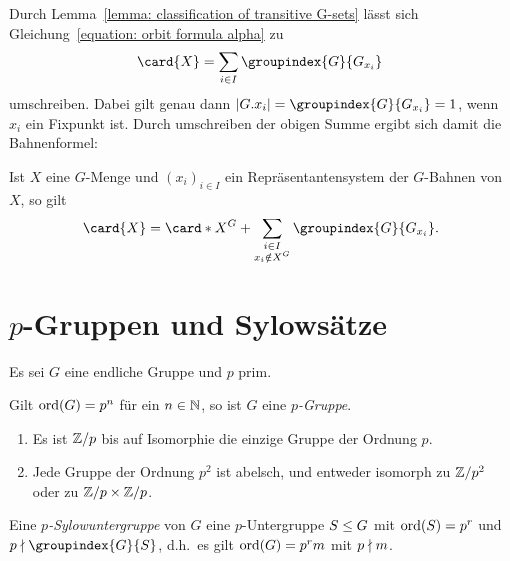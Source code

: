 Durch Lemma~\ref{lemma: classification of transitive G-sets} lässt sich Gleichung~\eqref{equation: orbit formula alpha} zu
\[
    \card{X}
  = \sum_{i \in I} \groupindex{G}{G_{x_i}} \,
\]
umschreiben.
Dabei gilt genau dann $|G.x_i| = \groupindex{G}{G_{x_i}} = 1$, wenn $x_i$ ein Fixpunkt ist.
Durch umschreiben der obigen Summe ergibt sich damit die Bahnenformel:

\begin{corollary}[Bahnenformel]
  Ist $X$ eine $G$-Menge und $(x_i)_{i \in I}$ ein Repräsentantensystem der $G$-Bahnen von $X$, so gilt
  \[
      \card{X}
    =   \card*{X^G}
      + \sum_{\substack{i \in I \\ x_i \notin X^G}} \groupindex{G}{G_{x_i}}.
  \]

\end{corollary}





\section{\texorpdfstring{$p$}{p}-Gruppen und Sylowsätze}

Es sei $G$ eine endliche Gruppe und $p$ prim.

\begin{definition}
  Gilt $\operatorname{ord}(G) = p^n$ für ein $n \in \mathbb{N}$, so ist $G$ eine \emph{$p$-Gruppe}.
\end{definition}

\begin{example}
  \begin{enumerate}
    \item
      Es ist $\mathbb{Z}/p$ bis auf Isomorphie die einzige Gruppe der Ordnung $p$.
    \item
      Jede Gruppe der Ordnung $p^2$ ist abelsch, und entweder isomorph zu $\mathbb{Z}/p^2$ oder zu $\mathbb{Z}/p \times \mathbb{Z}/p$.
  \end{enumerate}
\end{example}


\begin{definition}
  Eine \emph{$p$-Sylow\-unter\-gruppe} von $G$ eine $p$-Untergruppe $S \mathrel{\leq} G$ mit $\operatorname{ord}(S) = p^r$ und $p \notdivides \groupindex{G}{S}$, d.h.\ es gilt $\operatorname{ord}(G) = p^r m$ mit $p \mathrel{\nmid} m$.
\end{definition}

